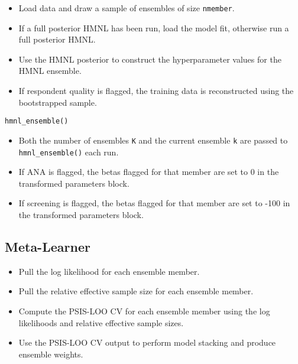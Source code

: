 \documentclass[12pt,titlepage]{mktg-article}
\begin{document}
\begin{itemize}
\tightlist
\item
  Load data and draw a sample of ensembles of size \texttt{nmember}.
\item
  If a full posterior HMNL has been run, load the model fit, otherwise run a full posterior HMNL.
\item
  Use the HMNL posterior to construct the hyperparameter values for the HMNL ensemble.
\item
  If respondent quality is flagged, the training data is reconstructed using the bootstrapped sample.
\end{itemize}

\texttt{hmnl\_ensemble()}

\begin{itemize}
\tightlist
\item
  Both the number of ensembles \texttt{K} and the current ensemble \texttt{k} are passed to \texttt{hmnl\_ensemble()} each run.
\item
  If ANA is flagged, the betas flagged for that member are set to 0 in the transformed parameters block.
\item
  If screening is flagged, the betas flagged for that member are set to -100 in the transformed parameters block.
\end{itemize}

\hypertarget{meta-learner}{%
\subsection{Meta-Learner}\label{meta-learner}}

\begin{itemize}
\tightlist
\item
  Pull the log likelihood for each ensemble member.
\item
  Pull the relative effective sample size for each ensemble member.
\item
  Compute the PSIS-LOO CV for each ensemble member using the log likelihoods and relative effective sample sizes.
\item
  Use the PSIS-LOO CV output to perform model stacking and produce ensemble weights.
\end{itemize}

\pagebreak


\end{document}
